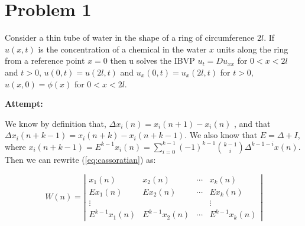 \documentclass[12pt,letterpaper]{article}
\theoremstyle{definition}
\begin{document}
\section*{Problem 1}

Consider a thin tube of water in the shape of a ring of circumference $2l$.
If $u(x, t)$ is the concentration of a chemical in the water $x$ units along the ring from a reference
point $x = 0$ then u solves the IBVP $u_t = Du_{xx}$ for $0 < x < 2l$ and $t > 0$, $u(0, t) = u(2l, t)$
and $u_x(0, t) = u_x(2l, t)$ for $t > 0$, $u(x, 0) = \phi(x)$ for $0 < x < 2l$.



\textbf{Attempt:}
\begin{changemargin}{.5cm}{0cm}

We know by definition that,  $\Delta x_i(n)=x_i(n+1)- x_i(n)$ , and that $\Delta x_i(n+k-1)=x_i(n+k)-x_i(n+k-1)$. We also know that $E= \Delta + I$, where $x_i(n+k-1) = E^{k-1}x_i(n) =\sum_{i=0}^{k-1} (-1)^{k-1} {k-1 \choose i} \Delta^{k-1-i}x(n)$. Then we can rewrite (\ref{eq:cassoratian}) as:

\begin{equation*}
    W(n) = \left|\begin{matrix}
        x_1(n) & x_2(n) &  \cdots & x_k(n) \\
        Ex_1(n) & Ex_2(n) & \cdots & Ex_k(n)\\
        \vdots & & & \vdots\\
        E^{k-1}x_1(n) & E^{k-1}x_2 (n) & \cdots & E^{k-1}x_k(n)
    \end{matrix}\right|
\end{equation*}


\end{changemargin}
\end{document}
